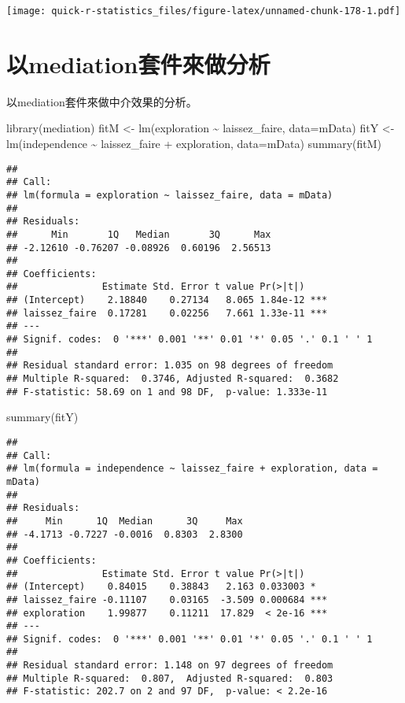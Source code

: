 \documentclass[
]{book}
\newenvironment{Shaded}{\begin{snugshade}}{\end{snugshade}}
\newcommand{\AttributeTok}[1]{\textcolor[rgb]{0.77,0.63,0.00}{#1}}
\newcommand{\FunctionTok}[1]{\textcolor[rgb]{0.00,0.00,0.00}{#1}}
\newcommand{\NormalTok}[1]{#1}
\newcommand{\OtherTok}[1]{\textcolor[rgb]{0.56,0.35,0.01}{#1}}
\newcommand{\SpecialCharTok}[1]{\textcolor[rgb]{0.00,0.00,0.00}{#1}}
\begin{document}
\texttt{[image: quick-r-statistics\_files/figure-latex/unnamed-chunk-178-1.pdf]}

\hypertarget{ux4ee5mediationux5957ux4ef6ux4f86ux505aux5206ux6790}{%
\section{以mediation套件來做分析}\label{ux4ee5mediationux5957ux4ef6ux4f86ux505aux5206ux6790}}

以mediation套件來做中介效果的分析。

\begin{Shaded}
\begin{Highlighting}[]
\FunctionTok{library}\NormalTok{(mediation)}
\NormalTok{fitM }\OtherTok{\textless{}{-}} \FunctionTok{lm}\NormalTok{(exploration }\SpecialCharTok{\textasciitilde{}}\NormalTok{ laissez\_faire, }\AttributeTok{data=}\NormalTok{mData)}
\NormalTok{fitY }\OtherTok{\textless{}{-}} \FunctionTok{lm}\NormalTok{(independence }\SpecialCharTok{\textasciitilde{}}\NormalTok{ laissez\_faire }\SpecialCharTok{+}\NormalTok{ exploration, }\AttributeTok{data=}\NormalTok{mData)}
\FunctionTok{summary}\NormalTok{(fitM)}
\end{Highlighting}
\end{Shaded}

\begin{verbatim}
## 
## Call:
## lm(formula = exploration ~ laissez_faire, data = mData)
## 
## Residuals:
##      Min       1Q   Median       3Q      Max 
## -2.12610 -0.76207 -0.08926  0.60196  2.56513 
## 
## Coefficients:
##               Estimate Std. Error t value Pr(>|t|)    
## (Intercept)    2.18840    0.27134   8.065 1.84e-12 ***
## laissez_faire  0.17281    0.02256   7.661 1.33e-11 ***
## ---
## Signif. codes:  0 '***' 0.001 '**' 0.01 '*' 0.05 '.' 0.1 ' ' 1
## 
## Residual standard error: 1.035 on 98 degrees of freedom
## Multiple R-squared:  0.3746, Adjusted R-squared:  0.3682 
## F-statistic: 58.69 on 1 and 98 DF,  p-value: 1.333e-11
\end{verbatim}

\begin{Shaded}
\begin{Highlighting}[]
\FunctionTok{summary}\NormalTok{(fitY)}
\end{Highlighting}
\end{Shaded}

\begin{verbatim}
## 
## Call:
## lm(formula = independence ~ laissez_faire + exploration, data = mData)
## 
## Residuals:
##     Min      1Q  Median      3Q     Max 
## -4.1713 -0.7227 -0.0016  0.8303  2.8300 
## 
## Coefficients:
##               Estimate Std. Error t value Pr(>|t|)    
## (Intercept)    0.84015    0.38843   2.163 0.033003 *  
## laissez_faire -0.11107    0.03165  -3.509 0.000684 ***
## exploration    1.99877    0.11211  17.829  < 2e-16 ***
## ---
## Signif. codes:  0 '***' 0.001 '**' 0.01 '*' 0.05 '.' 0.1 ' ' 1
## 
## Residual standard error: 1.148 on 97 degrees of freedom
## Multiple R-squared:  0.807,  Adjusted R-squared:  0.803 
## F-statistic: 202.7 on 2 and 97 DF,  p-value: < 2.2e-16
\end{verbatim}
\end{document}

